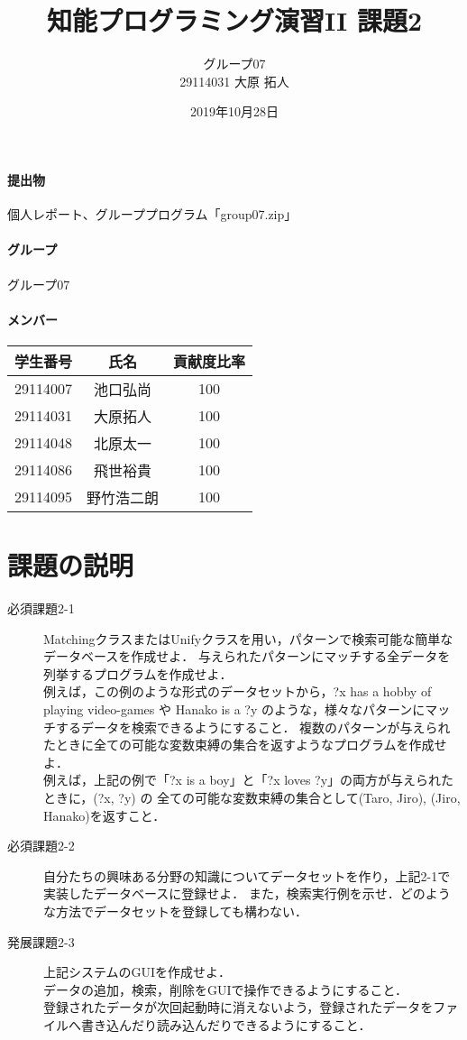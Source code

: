 \documentclass{jarticle}
\title{知能プログラミング演習II 課題2}
\author{グループ07\\
  29114031 大原 拓人\\
}
\date{2019年10月28日}
\begin{document}
\maketitle

\paragraph{提出物} 個人レポート、グループプログラム「group07.zip」
\paragraph{グループ} グループ07
\paragraph{メンバー}
\begin{tabular}{|c|c|c|}
  \hline
  学生番号&氏名&貢献度比率\\
  \hline\hline
  29114007&池口弘尚&100\\
  \hline
  29114031&大原拓人&100\\
  \hline
  29114048&北原太一&100\\
  \hline
  29114086&飛世裕貴&100\\
  \hline
  29114095&野竹浩二朗&100\\
  \hline
\end{tabular}

\section{課題の説明}
\begin{description}
    \item[必須課題2-1] MatchingクラスまたはUnifyクラスを用い，パターンで検索可能な簡単なデータベースを作成せよ．
    与えられたパターンにマッチする全データを列挙するプログラムを作成せよ．
    \\ 例えば，この例のような形式のデータセットから，?x has a hobby of playing video-games や 
    Hanako is a ?y のような，様々なパターンにマッチするデータを検索できるようにすること．
    複数のパターンが与えられたときに全ての可能な変数束縛の集合を返すようなプログラムを作成せよ．
    \\ 例えば，上記の例で「?x is a boy」と「?x loves ?y」の両方が与えられたときに，(?x, ?y) の
    全ての可能な変数束縛の集合として{(Taro, Jiro), (Jiro, Hanako)}を返すこと．
    \item[必須課題2-2] 自分たちの興味ある分野の知識についてデータセットを作り，上記2-1で実装したデータベースに登録せよ．
    また，検索実行例を示せ．どのような方法でデータセットを登録しても構わない．
    \item[発展課題2-3] 上記システムのGUIを作成せよ．
    \\ データの追加，検索，削除をGUIで操作できるようにすること．
    \\ 登録されたデータが次回起動時に消えないよう，登録されたデータをファイルへ書き込んだり読み込んだりできるようにすること．
\end{description}
\end{document}
